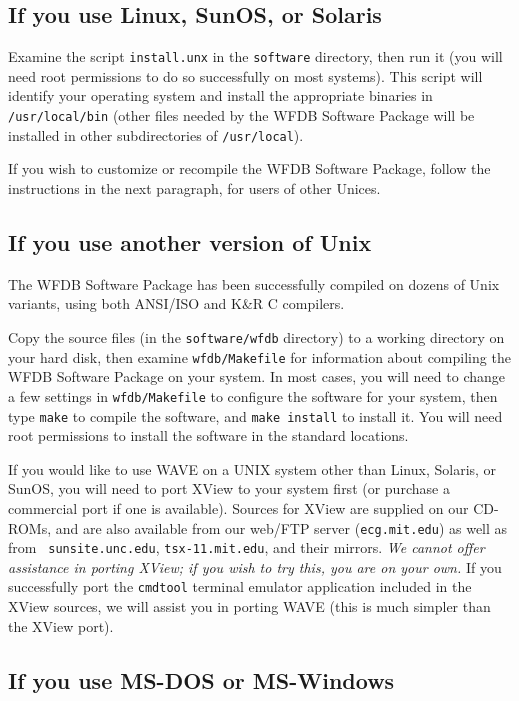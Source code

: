 \subsection*{If you use Linux, SunOS, or Solaris}

Examine the script {\tt install.unx} in the {\tt software} directory,
then run it (you will need root permissions to do so successfully on
most systems).  This script will identify your operating system and
install the appropriate binaries in {\tt /usr/local/bin} (other files
needed by the WFDB Software Package will be installed in other
subdirectories of {\tt /usr/local}).

If you wish to customize or recompile the WFDB Software Package, follow the
instructions in the next paragraph, for users of other Unices.

\subsection*{If you use another version of Unix}

The WFDB Software Package has been successfully compiled on dozens of Unix
variants, using both ANSI/ISO and K\&R C compilers.

Copy the source files (in the {\tt software/wfdb} directory) to a working
directory on your hard disk, then examine {\tt wfdb/Makefile} for information
about compiling the WFDB Software Package on your system.  In most cases, you
will need to change a few settings in {\tt wfdb/Makefile} to configure the
software for your system, then type {\tt make} to compile the software, and
{\tt make install} to install it.  You will need root permissions to install
the software in the standard locations.  

If you would like to use {\sf WAVE} on a UNIX system other than Linux,
Solaris, or SunOS, you will need to port XView to your system first
(or purchase a commercial port if one is available).  Sources for
XView are supplied on our CD-ROMs, and are also available from our
web/FTP server ({\tt ecg.mit.edu}) as well as from {\tt
sunsite.unc.edu}, {\tt tsx-11.mit.edu}, and their mirrors.  \emph{We
cannot offer assistance in porting XView; if you wish to try this, you
are on your own.}  If you successfully port the {\tt cmdtool} terminal
emulator application included in the XView sources, we will assist you
in porting {\sf WAVE} (this is much simpler than the XView port).

\subsection*{If you use MS-DOS or MS-Windows}

